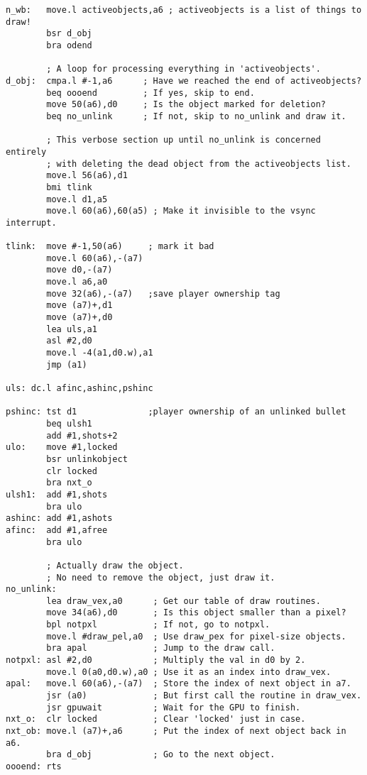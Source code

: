 \begin{lstlisting}
n_wb:   move.l activeobjects,a6 ; activeobjects is a list of things to draw!
        bsr d_obj
        bra odend

        ; A loop for processing everything in 'activeobjects'.
d_obj:  cmpa.l #-1,a6      ; Have we reached the end of activeobjects? 
        beq oooend         ; If yes, skip to end.
        move 50(a6),d0     ; Is the object marked for deletion? 
        beq no_unlink      ; If not, skip to no_unlink and draw it.

        ; This verbose section up until no_unlink is concerned entirely 
        ; with deleting the dead object from the activeobjects list.
        move.l 56(a6),d1
        bmi tlink
        move.l d1,a5
        move.l 60(a6),60(a5) ; Make it invisible to the vsync interrupt.

tlink:  move #-1,50(a6)     ; mark it bad
        move.l 60(a6),-(a7)
        move d0,-(a7)
        move.l a6,a0
        move 32(a6),-(a7)   ;save player ownership tag
        move (a7)+,d1
        move (a7)+,d0
        lea uls,a1
        asl #2,d0
        move.l -4(a1,d0.w),a1
        jmp (a1)

uls: dc.l afinc,ashinc,pshinc

pshinc: tst d1              ;player ownership of an unlinked bullet
        beq ulsh1
        add #1,shots+2
ulo:    move #1,locked
        bsr unlinkobject        
        clr locked
        bra nxt_o
ulsh1:  add #1,shots
        bra ulo
ashinc: add #1,ashots
afinc:  add #1,afree
        bra ulo

        ; Actually draw the object.
        ; No need to remove the object, just draw it.
no_unlink:      
        lea draw_vex,a0      ; Get our table of draw routines.
        move 34(a6),d0       ; Is this object smaller than a pixel?
        bpl notpxl           ; If not, go to notpxl.
        move.l #draw_pel,a0  ; Use draw_pex for pixel-size objects.
        bra apal             ; Jump to the draw call. 
notpxl: asl #2,d0            ; Multiply the val in d0 by 2.
        move.l 0(a0,d0.w),a0 ; Use it as an index into draw_vex.
apal:   move.l 60(a6),-(a7)  ; Store the index of next object in a7. 
        jsr (a0)             ; But first call the routine in draw_vex.
        jsr gpuwait          ; Wait for the GPU to finish.
nxt_o:  clr locked           ; Clear 'locked' just in case.
nxt_ob: move.l (a7)+,a6      ; Put the index of next object back in a6.
        bra d_obj            ; Go to the next object.
oooend: rts

\end{lstlisting}

